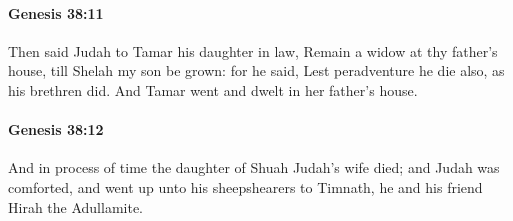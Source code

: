 		\paragraph{Genesis 38:11} %
			\label{GENESIS-38-11}

			Then said Judah to Tamar his daughter in law, Remain a widow at thy father's house, till Shelah my son be grown: for he said, Lest peradventure he die also, as his brethren did. And Tamar went and dwelt in her father's house.


		\paragraph{Genesis 38:12} %
			\label{GENESIS-38-12}

			And in process of time the daughter of Shuah Judah's wife died; and Judah was comforted, and went up unto his sheepshearers to Timnath, he and his friend Hirah the Adullamite.

